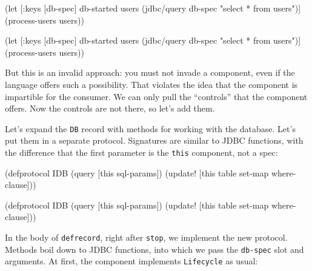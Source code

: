 \ifnarrow

\begin{english}
  \begin{clojure}
(let [{:keys [db-spec]} db-started
      users (jdbc/query db-spec
              "select * from users")]
  (process-users users))
  \end{clojure}
\end{english}

\else

\begin{english}
  \begin{clojure}
(let [{:keys [db-spec]} db-started
      users (jdbc/query db-spec "select * from users")]
  (process-users users))
  \end{clojure}
\end{english}

\fi

But this is an invalid approach: you must not invade a component, even if the language offers such a possibility. That violates the idea that the component is impartible for the consumer. We can only pull the ``controls'' that the component offers. Now the controls are not there, so let's add them.

Let's expand the \verb|DB| record with methods for working with the database. Let's put them in a separate protocol. Signatures are similar to JDBC functions, with the difference that the first parameter is the \verb|this| component, not a spec:


\ifnarrow

\begin{english}
  \begin{clojure}
(defprotocol IDB
  (query [this sql-params])
  (update!
    [this table set-map where-clause]))
  \end{clojure}
\end{english}

\else

\begin{english}
  \begin{clojure}
(defprotocol IDB
  (query [this sql-params])
  (update! [this table set-map where-clause]))
  \end{clojure}
\end{english}

\fi

In the body of \verb|defrecord|, right after \verb|stop|, we implement the new protocol. Methods boil down to JDBC functions, into which we pass the \verb|db-spec| slot and arguments. At first, the component implements \verb|Lifecycle| as usual:


